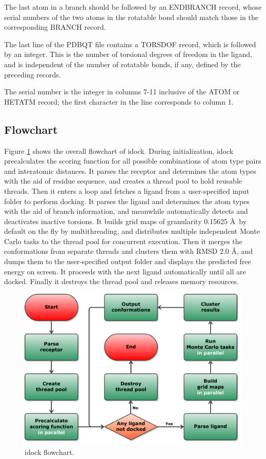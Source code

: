 The last atom in a branch should be followed by an ENDBRANCH record, whose serial numbers of the two atoms in the rotatable bond should match those in the corresponding BRANCH record.

The last line of the PDBQT file contains a TORSDOF record, which is followed by an integer. This is the number of torsional degrees of freedom in the ligand, and is independent of the number of rotatable bonds, if any, defined by the preceding records.

The serial number is the integer in columns 7-11 inclusive of the ATOM or HETATM record; the first character in the line corresponds to column 1.

\subsection{Flowchart}

Figure \ref{idock:Flowchart} shows the overall flowchart of idock. During initialization, idock precalculates the scoring function for all possible combinations of atom type pairs and interatomic distances. It parses the receptor and determines the atom types with the aid of residue sequence, and creates a thread pool to hold reusable threads. Then it enters a loop and fetches a ligand from a user-specified input folder to perform docking. It parses the ligand and determines the atom types with the aid of branch information, and meanwhile automatically detects and deactivates inactive torsions. It builds grid maps of granularity 0.15625 \AA\ by default on the fly by multithreading, and distributes multiple independent Monte Carlo tasks to the thread pool for concurrent execution. Then it merges the conformations from separate threads and clusters them with RMSD 2.0 \AA, and dumps them to the user-specified output folder and displays the predicted free energy on screen. It proceeds with the next ligand automatically until all are docked. Finally it destroys the thread pool and releases memory resources.

\begin{figure}
\centering
\includegraphics[width=\linewidth]{../idock/Flowchart.pdf}
\caption{idock flowchart.}
\label{idock:Flowchart}
\end{figure}

